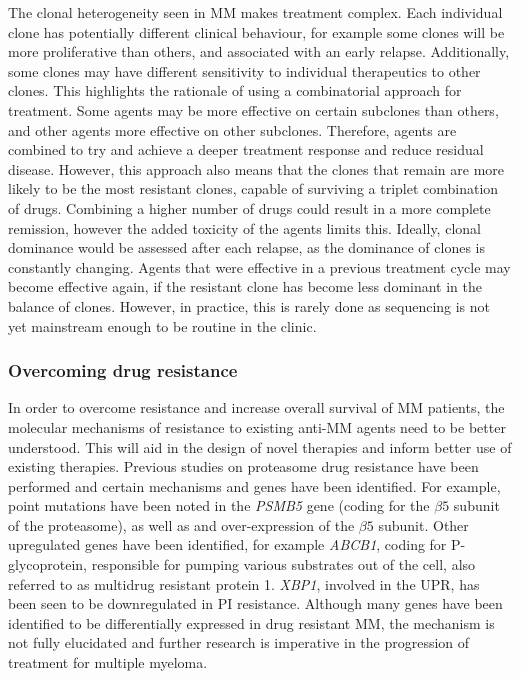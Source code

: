 The clonal heterogeneity seen in MM makes treatment complex.
Each individual clone has potentially different clinical behaviour, for example some clones will be more proliferative than others, and associated with an early relapse.
Additionally, some clones may have different sensitivity to individual therapeutics to other clones.
This highlights the rationale of using a combinatorial approach for treatment.
Some agents may be more effective on certain subclones than others, and other agents more effective on other subclones.
Therefore, agents are combined to try and achieve a deeper treatment response and reduce residual disease.
However, this approach also means that the clones that remain are more likely to be the most resistant clones, capable of surviving a triplet combination of drugs.
Combining a higher number of drugs could result in a more complete remission, however the added toxicity of the agents limits this.
Ideally, clonal dominance would be assessed after each relapse, as the dominance of clones is constantly changing.
Agents that were effective in a previous treatment cycle may become effective again, if the resistant clone has become less dominant in the balance of clones\cite{brioli2014impact}.
However, in practice, this is rarely done as sequencing is not yet mainstream enough to be routine in the clinic.

\subsubsection{Overcoming drug resistance}
In order to overcome resistance and increase overall survival of MM patients, the molecular mechanisms of resistance to existing anti-MM agents need to be better understood.
This  will aid in the design of novel therapies and inform better use of existing therapies.
Previous studies on proteasome drug resistance have been performed and certain mechanisms and genes have been identified.
For example, point mutations have been noted in the \textit{PSMB5} gene (coding for the $\beta5$ subunit of the proteasome), as well as and over-expression of the $\beta5$ subunit\cite{robak2018drug}.
Other upregulated genes have been identified, for example \textit{ABCB1}, coding for P-glycoprotein, responsible for pumping various substrates out of the cell, also referred to as multidrug resistant protein 1.
\textit{XBP1}, involved in the UPR, has been seen to be downregulated in PI resistance\cite{robak2018drug}.
Although many genes have been identified to be differentially expressed in drug resistant MM, the mechanism is not fully elucidated and further research is imperative in the progression of treatment for multiple myeloma.

